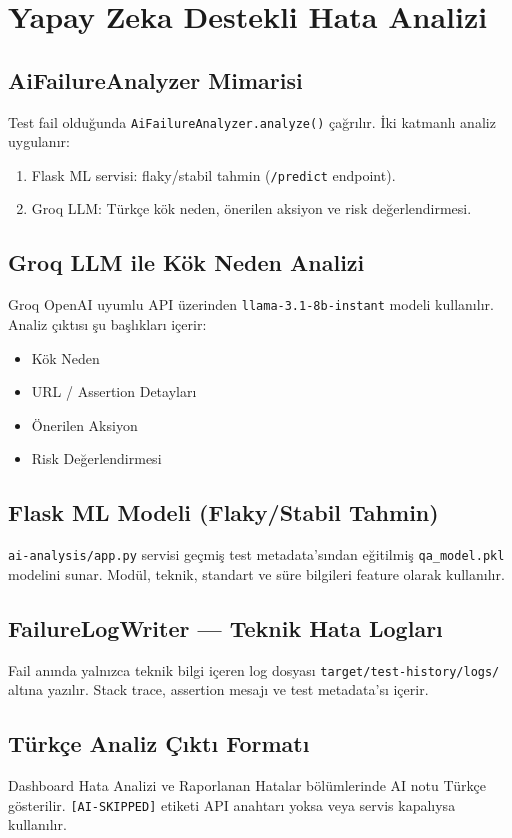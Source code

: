 \chapter{Yapay Zeka Destekli Hata Analizi}

\section{AiFailureAnalyzer Mimarisi}
Test fail olduğunda \texttt{AiFailureAnalyzer.analyze()} çağrılır. İki katmanlı analiz uygulanır:
\begin{enumerate}
  \item Flask ML servisi: flaky/stabil tahmin (\texttt{/predict} endpoint).
  \item Groq LLM: Türkçe kök neden, önerilen aksiyon ve risk değerlendirmesi.
\end{enumerate}

\section{Groq LLM ile Kök Neden Analizi}
Groq OpenAI uyumlu API üzerinden \texttt{llama-3.1-8b-instant} modeli kullanılır. Analiz çıktısı şu başlıkları içerir:
\begin{itemize}
  \item Kök Neden
  \item URL / Assertion Detayları
  \item Önerilen Aksiyon
  \item Risk Değerlendirmesi
\end{itemize}

\section{Flask ML Modeli (Flaky/Stabil Tahmin)}
\texttt{ai-analysis/app.py} servisi geçmiş test metadata'sından eğitilmiş \texttt{qa\_model.pkl} modelini sunar. Modül, teknik, standart ve süre bilgileri feature olarak kullanılır.

\section{FailureLogWriter — Teknik Hata Logları}
Fail anında yalnızca teknik bilgi içeren log dosyası \texttt{target/test-history/logs/} altına yazılır. Stack trace, assertion mesajı ve test metadata'sı içerir.

\section{Türkçe Analiz Çıktı Formatı}
Dashboard Hata Analizi ve Raporlanan Hatalar bölümlerinde AI notu Türkçe gösterilir. \texttt{[AI-SKIPPED]} etiketi API anahtarı yoksa veya servis kapalıysa kullanılır.

